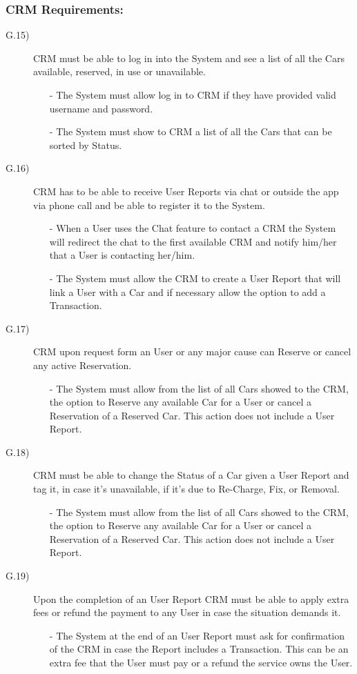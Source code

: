 \documentclass[a4paper]{article}
\begin{document}
\subsubsection{\textbf{CRM Requirements:}}
\begin{description}
\item [G.15)]CRM must be able to log in into the System and see a list of all the Cars available, reserved, in use or unavailable.
\begin{itemize}
	\item[-]The System must allow log in to CRM if they have provided valid username and password.
	\item[-]The System must show to CRM a list of all the Cars that can be sorted by Status.
\end{itemize}
\item [G.16)]CRM has to be able to receive User Reports via chat or outside the app via phone call and be able to register it to the System.
\begin{itemize}
	\item[-]When a User uses the Chat feature to contact a CRM the System will redirect the chat to the first available CRM and notify him/her that a User is contacting her/him.
	\item[-]The System must allow the CRM to create a User Report that will link a User with a Car and if necessary allow the option to add a Transaction.
\end{itemize}
\item [G.17)]CRM upon request form an User or any major cause can Reserve or cancel any active Reservation.
\begin{itemize}
	\item[-]The System must allow from the list of all Cars showed to the CRM, the option to Reserve any available Car for a User or cancel a Reservation of a Reserved Car. This action does not include a User Report.
\end{itemize}
\item [G.18)]CRM must be able to change the Status of a Car given a User Report and tag it, in case it's unavailable, if it's due to Re-Charge, Fix, or Removal.
\begin{itemize}
	\item[-]The System must allow from the list of all Cars showed to the CRM, the option to Reserve any available Car for a User or cancel a Reservation of a Reserved Car. This action does not include a User Report.
\end{itemize}
\item [G.19)]Upon the completion of an User Report CRM must be able to apply extra fees or refund the payment to any User in case the situation demands it.
\begin{itemize}
	\item[-]The System at the end of an User Report must ask for confirmation of the CRM in case the Report includes a Transaction. This can be an extra fee that the User must pay or a refund the service owns the User.
\end{itemize}
\end {description}
\end{document}
